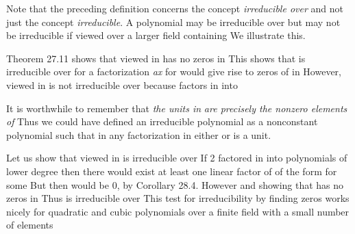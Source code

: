 \documentclass[11pt,oneside]{article}
\begin{document}
\begin{BookBody}

Note that the preceding definition concerns the concept\textit{ irreducible over}  and not just the concept\textit{ irreducible}. A polynomial  may be irreducible over  but may not be irreducible if viewed over a larger field  containing  We illustrate this.

 Theorem 27.11 shows that  viewed in  has no zeros in  This shows that  is irreducible over  for a factorization \textit{ax}  for   would give rise to zeros of  in  However,  viewed in  is not irreducible over  because  factors in  into \BookEnd{\blacktriangle}

It is worthwhile to remember that\textit{ the units in}  \textit{are precisely the nonzero ele}\textit{ments of}  Thus we could have defined an irreducible polynomial  as a nonconstant polynomial such that in any factorization  in  either  or  is a unit.

 Let us show that  viewed in  is irreducible over  If  2 factored in  into polynomials of lower degree then there would exist at least one linear factor of  of the form  for some  But then  would be 0, by Corollary 28.4. However and  showing that  has no zeros in  Thus  is irreducible over  This test for irreducibility by finding zeros works nicely for quadratic and cubic polynomials over a finite field with a small number of elements\BookEnd{\blacktriangle}


\end{BookBody}
\end{document}
